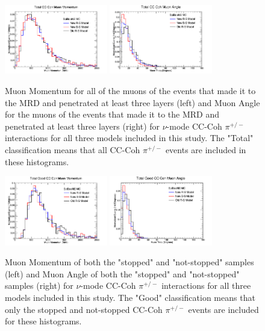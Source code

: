 \documentclass[11pt]{article}
\begin{document}
\begin{figure}[H]
\centering
\includegraphics[width=0.4\textwidth]{CCCohPlots/NMCCCohTotalMomentum.png}
\includegraphics[width=0.4\textwidth]{CCCohPlots/NMCCCohTotalAngle.png}
\caption{Muon Momentum for all of the muons of the events that made it to the MRD and penetrated at least three layers (left) and Muon Angle for the muons of the events that made it to the MRD and penetrated at least three layers (right) for $\nu$-mode CC-Coh $\pi^{+/-}$ interactions for all three models included in this study. The "Total" classification means that all CC-Coh $\pi^{+/-}$ events are included in these histograms.}
\end{figure}\label{fig:NuModeCCCohTotalMomAndAng}


\begin{figure}[H]
\centering
\includegraphics[width=0.4\textwidth]{CCCohPlots/NMCCCohGoodMomentum.png}
\includegraphics[width=0.4\textwidth]{CCCohPlots/NMCCCohGoodAngle.png}
\caption{Muon Momentum of both the "stopped" and "not-stopped" samples (left) and Muon Angle of both the "stopped" and "not-stopped" samples (right) for $\nu$-mode CC-Coh $\pi^{+/-}$ interactions for all three models included in this study. The "Good" classification means that only the stopped and not-stopped CC-Coh $\pi^{+/-}$ events are included for these histograms.}
\end{figure}\label{fig:NuModeCCCohGoodMomAndAng}
\end{document}
